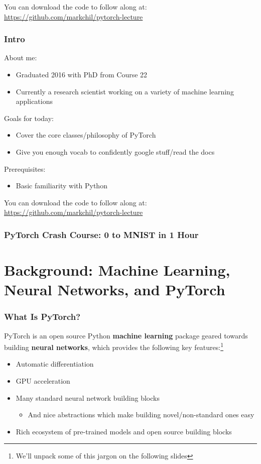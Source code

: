 \documentclass[xcolor={x11names,table}]{beamer}
\title{\stabletitle}
\author[markchil] 
{Mark Chilenski\\(markchil)}
\date{November 16, 2021}
\newcommand{\stabletitle}{PyTorch Crash Course: 0 to MNIST in 1 Hour}
\begin{document}
\begin{frame}
 	\titlepage
	
	\begin{center}
		\item You can download the code to follow along at: \url{https://github.com/markchil/pytorch-lecture}
	\end{center}
\end{frame}

\begin{frame}
	\frametitle{Intro}
	About me:
	\begin{itemize}
		\item Graduated 2016 with PhD from Course 22
		\item Currently a research scientist working on a variety of machine learning applications
	\end{itemize}
	Goals for today:
	\begin{itemize}
		\item Cover the core classes/philosophy of PyTorch
		\item Give you enough vocab to confidently google stuff/read the docs
	\end{itemize}
	Prerequisites:
	\begin{itemize}
		\item Basic familiarity with Python
	\end{itemize}
	You can download the code to follow along at: \url{https://github.com/markchil/pytorch-lecture}
\end{frame}

\begin{frame}
	\frametitle{\stabletitle}
	\tableofcontents
\end{frame}

\section{Background: Machine Learning, Neural Networks, and PyTorch}

\begin{frame}
	\frametitle{What Is PyTorch?}
	PyTorch is an open source Python \textbf{machine learning} package geared towards building \textbf{neural networks}, which provides the following key features:\footnote{We'll unpack some of this jargon on the following slides}
	\begin{itemize}
		\item Automatic differentiation
		\item GPU acceleration
		\item Many standard neural network building blocks
		\begin{itemize}
			\item And nice abstractions which make building novel/non-standard ones easy
		\end{itemize}
		\item Rich ecosystem of pre-trained models and open source building blocks
	\end{itemize}
\end{frame}
\end{document}
